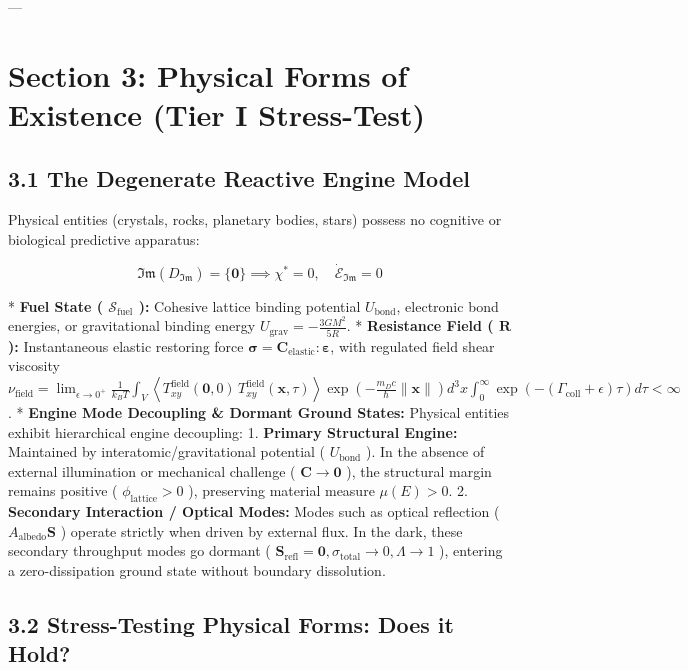 \documentclass[11pt,a4paper]{article}
\theoremstyle{definition}
\theoremstyle{remark}
\begin{document}
---

\section{Section 3: Physical Forms of Existence (Tier I Stress-Test)}

\subsection{3.1 The Degenerate Reactive Engine Model}
Physical entities (crystals, rocks, planetary bodies, stars) possess no cognitive or biological predictive apparatus:


\begin{equation}
\mathfrak{Im}(D_{\mathfrak{Im}}) = \{\mathbf{0}\} \implies \chi^* = 0, \quad \dot{\mathcal{E}}_{\mathfrak{Im}} = 0
\end{equation}


* \textbf{Fuel State ( $\mathcal{S}_{\text{fuel}}$ ):} Cohesive lattice binding potential $U_{\text{bond}}$, electronic bond energies, or gravitational binding energy $U_{\text{grav}} = -\frac{3 G M^2}{5 R}$.
* \textbf{Resistance Field ( $\mathbf{R}$ ):} Instantaneous elastic restoring force $\boldsymbol{\sigma} = \mathbf{C}_{\text{elastic}} : \boldsymbol{\varepsilon}$, with regulated field shear viscosity $\nu_{\text{field}} = \lim_{\epsilon \to 0^+} \frac{1}{k_B T} \int_V \left\langle T_{xy}^{\text{field}}(\mathbf{0}, 0) \, T_{xy}^{\text{field}}(\mathbf{x}, \tau) \right\rangle \exp\left( -\frac{m_D c}{\hbar}\|\mathbf{x}\| \right) d^3x \int_0^\infty \exp\left( -\left(\Gamma_{\text{coll}} + \epsilon\right)\tau \right) d\tau < \infty$.
* \textbf{Engine Mode Decoupling \& Dormant Ground States:}
Physical entities exhibit hierarchical engine decoupling:
1. \textbf{Primary Structural Engine:} Maintained by interatomic/gravitational potential ( $U_{\text{bond}}$ ). In the absence of external illumination or mechanical challenge ( $\mathbf{C} \to \mathbf{0}$ ), the structural margin remains positive ( $\phi_{\text{lattice}} > 0$ ), preserving material measure $\mu(E) > 0$.
2. \textbf{Secondary Interaction / Optical Modes:} Modes such as optical reflection ( $A_{\text{albedo}} \mathbf{S}$ ) operate strictly when driven by external flux. In the dark, these secondary throughput modes go dormant ( $\mathbf{S}_{\text{refl}} = \mathbf{0}, \sigma_{\text{total}} \to 0, \Lambda \to 1$ ), entering a zero-dissipation ground state without boundary dissolution.

\subsection{3.2 Stress-Testing Physical Forms: Does it Hold?}
\end{document}
